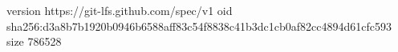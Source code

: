 version https://git-lfs.github.com/spec/v1
oid sha256:d3a8b7b1920b0946b6588aff83c54f8838c41b3dc1cb0af82cc4894d61cfc593
size 786528
